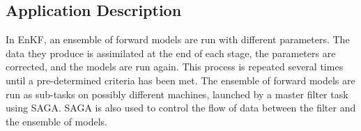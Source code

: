 \documentclass{llncs}
\begin{document}
\upp

\subsection{Application Description}


\upp

In EnKF, an ensemble of forward models are run with different
parameters. The data they produce is assimilated at the end of each
stage, the parameters are corrected, and the models are run
again. This process is repeated several times until a pre-determined
criteria has been met. The ensemble of forward models are run as
sub-tasks on possibly different machines, launched by a master filter
task using SAGA. SAGA is also used to control the flow of data between
the filter and the ensemble of models.

\end{document}
